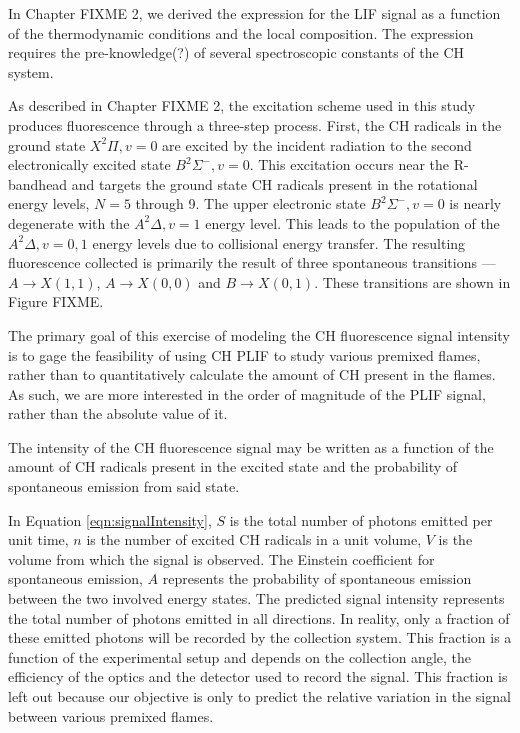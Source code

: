 In Chapter FIXME 2, we derived the expression for the LIF signal as a function of the thermodynamic conditions and the local composition.
The expression requires the pre-knowledge(?) of several spectroscopic constants of the CH system.



As described in Chapter FIXME 2, the excitation scheme used in this study produces fluorescence through a three-step process.
First, the CH radicals in the ground state \(X^2\Pi, v=0\) are excited by the incident radiation to the second electronically excited state \(B^2\Sigma^-, v=0\).
This excitation occurs near the R-bandhead and targets the ground state CH radicals present in the rotational energy levels, \(N=5\) through 9.
The upper electronic state \(B^2\Sigma^-, v=0\) is nearly degenerate with the \(A^2\Delta, v=1\) energy level.
This leads to the population of the \(A^2\Delta, v=0,1\) energy levels due to collisional energy transfer.
The resulting fluorescence collected is primarily the result of three spontaneous transitions --- \(A\rightarrow X(1,1)\), \(A\rightarrow X(0,0)\) and \(B\rightarrow X(0,1)\).
These transitions are shown in Figure FIXME.

The primary goal of this exercise of modeling the CH fluorescence signal intensity is to gage the feasibility of using CH PLIF to study various premixed flames, rather than to quantitatively calculate the amount of CH present in the flames.
As such, we are more interested in the order of magnitude of the PLIF signal, rather than the absolute value of it.

The intensity of the CH fluorescence signal may be written as a function of the amount of CH radicals present in the excited state and the probability of spontaneous emission from said state.


In Equation \ref{eqn:signalIntensity}, \(S\) is the total number of photons emitted per unit time, \(n\) is the number of excited CH radicals in a unit volume, \(V\) is the volume from which the signal is observed.
The Einstein coefficient for spontaneous emission, \(A\) represents the probability of spontaneous emission between the two involved energy states.
The predicted signal intensity represents the total number of photons emitted in all directions.
In reality, only a fraction of these emitted photons will be recorded by the collection system.
This fraction is a function of the experimental setup and depends on the collection angle, the efficiency of the optics and the detector used to record the signal.
This fraction is left out because our objective is only to predict the relative variation in the signal between various premixed flames.

